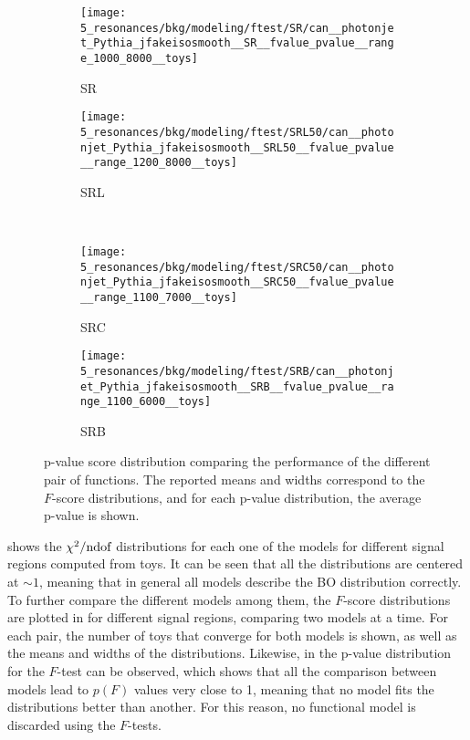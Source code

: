\begin{figure}[ht!]
    \centering
    \begin{subfigure}[h]{0.49\linewidth}
        \centering
        \texttt{[image: 5\_resonances/bkg/modeling/ftest/SR/can\_\_photonjet\_Pythia\_jfakeisosmooth\_\_SR\_\_fvalue\_pvalue\_\_range\_1000\_8000\_\_toys]}
        \caption{SR}
    \end{subfigure}
    \begin{subfigure}[h]{0.49\linewidth}
        \centering
        \texttt{[image: 5\_resonances/bkg/modeling/ftest/SRL50/can\_\_photonjet\_Pythia\_jfakeisosmooth\_\_SRL50\_\_fvalue\_pvalue\_\_range\_1200\_8000\_\_toys]}
        \caption{SRL}
    \end{subfigure}
    \\
    \begin{subfigure}[h]{0.49\linewidth}
        \centering
        \texttt{[image: 5\_resonances/bkg/modeling/ftest/SRC50/can\_\_photonjet\_Pythia\_jfakeisosmooth\_\_SRC50\_\_fvalue\_pvalue\_\_range\_1100\_7000\_\_toys]}
        \caption{SRC}
    \end{subfigure}
    \begin{subfigure}[h]{0.49\linewidth}
        \centering
        \texttt{[image: 5\_resonances/bkg/modeling/ftest/SRB/can\_\_photonjet\_Pythia\_jfakeisosmooth\_\_SRB\_\_fvalue\_pvalue\_\_range\_1100\_6000\_\_toys]}
        \caption{SRB}
    \end{subfigure}
    \caption{p-value score distribution comparing the performance of the different pair of functions. The reported means and widths correspond to the \(F\)-score distributions, and for each p-value distribution, the average p-value is shown.}
    \label{fig:bkg:modeling:preparation:ftest:ftest_pvalue}
\end{figure}

\Fig{\ref{fig:bkg:modeling:preparation:ftest:chi2ndof}} shows the \(\chi^{2} / \text{ndof}\) distributions for each one of the models for different signal regions computed from toys. It can be seen that all the distributions are centered at \(\sim 1\), meaning that in general all models describe the \ac{BO} distribution correctly. To further compare the different models among them, the \(F\)-score distributions are plotted in \Fig{\ref{fig:bkg:modeling:preparation:ftest:ftest}} for different signal regions, comparing two models at a time. For each pair, the number of toys that converge for both models is shown, as well as the means and widths of the distributions. Likewise, in \Fig{\ref{fig:bkg:modeling:preparation:ftest:ftest_pvalue}} the p-value distribution for the \(F\)-test can be observed, which shows that all the comparison between models lead to \(p(F)\) values very close to 1, meaning that no model fits the distributions better than another. For this reason, no functional model is discarded using the \(F\)-tests.

